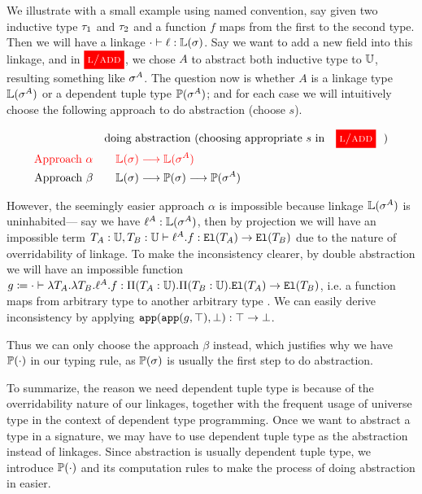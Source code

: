 We illustrate with a small example using named convention, say given two inductive type $\tau_1$ and $\tau_2$ and a function $f$ maps from the first to the second type. Then we will have a linkage $ {\cdot} \vdash {\ell} : {\mathbb{L}({\sigma})} $. Say we want to add a new field into this linkage, and in $\ruleref{l/add}$, we chose $A$ to abstract both inductive type to $\mathbb{U}$, resulting something like $\sigma^A$. The question now is whether $A$ is a linkage type $\mathbb{L}({\sigma^A})$ or a dependent tuple type $\mathbb{P}({\sigma^A})$; and for each case we will intuitively choose the following approach to do abstraction (choose $s$).

\begin{align*}
  & \text{doing abstraction (choosing appropriate $s$ in \ruleref{l/add})} \\ 
  \text{\textcolor{red}{Approach $\alpha$}}  \quad&\quad {\color{red} \TyLkg{\lsig} \longrightarrow \TyLkg{\lsig^A}} \\
  \text{Approach } \beta \quad&\quad  \TyLkg{\lsig} \longrightarrow \TyTkg{\lsig} \longrightarrow \TyTkg{\lsig^A}\\
\end{align*}


However, the seemingly easier approach $\alpha$ is impossible because linkage
$\mathbb{L}({\sigma^A})$ is uninhabited---%
say we have $\ell^A : \mathbb{L}({\sigma^A})$, then by projection we will have an impossible term $ {T_A : \mathbb{U}, T_B: \mathbb{U}} \vdash {\ell^A.f} : {\texttt{El}({T_A}) \to \texttt{El}({T_B})} $ due to the nature of overridability of linkage. To make the inconsistency clearer, by double abstraction we will have an impossible function $g \coloneq  {\cdot} \vdash {\ensuremath{\lambda {T_A}.{\lambda {T_B}.{\ell^A.f} } }} : {\Pi({T_A}:{\mathbb{U}}).{\Pi({T_B}:{\mathbb{U}}).{\texttt{El}({T_A}) \to \texttt{El}({T_B})}}}  $, i.e. a function maps from arbitrary type to another arbitrary type . We can easily derive inconsistency by applying $\texttt{app}({\texttt{app}({g},{\top})},{\bot}) : \top \to \bot$. 

Thus we can only choose the approach $\beta$ instead, which justifies why we have $\mathbb{P}({\cdot})$ in our typing rule, as $\mathbb{P}({\sigma})$ is usually the first step to do abstraction.

To summarize, the reason we need dependent tuple type is because of the overridability nature of our linkages, together with the frequent usage of universe type in the context of dependent type programming. Once we want to abstract a type in a signature, we may have to use dependent tuple type as the abstraction instead of linkages. Since abstraction is usually dependent tuple type, we introduce $\mathbb{P}({\cdot})$ and its computation rules to make the process of doing abstraction in \TT easier.




